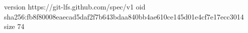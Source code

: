 version https://git-lfs.github.com/spec/v1
oid sha256:fb8f80008eaecad5daf2f7b643bdaa840bb4ae610ce145d01e4cf7e17ecc3014
size 74
